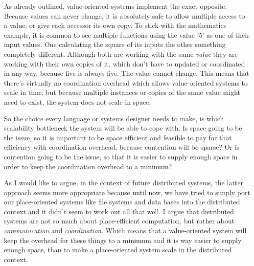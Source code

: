 As already outlined, value-oriented systems implement the exact
opposite. Because values can never change, it is absolutely
safe to allow multiple access to a value, or give each accessor
its own copy. To stick with the mathematics example, it is common
to see multiple functions using the value '5' as one of their
input values. One calculating the square of its inputs the other
something completely different. Although both are working with
the same \textit{value} they are working with their own copies of it,
which don't have to updated or coordinated in any way, because
five is always five. The value cannot change. This means that there's
virtually no coordination overhead which allows value-oriented
systems to scale in time, but because multiple instances or copies
of the same value might need to exist, the system does not scale in
space.
\newline

So the choice every language or systems designer needs to make,
is which scalability bottleneck the system will be able to cope with.
Is space going to be the issue, so it is important to be space efficient
and feasible to pay for that efficiency with coordination overhead,
because contention will be sparse? Or is contention going to be the
issue, so that it is easier to supply enough space in order to keep
the coordination overhead to a minimum?

As I would like to argue, in the context of future
distributed systems,
the latter approach seems more appropriate because until now, we
have tried to simply port our place-oriented systems like file
systems and data bases into the distributed context and it didn't
seem to work out all that well. I argue that distributed systems
are not so much about place-efficient computation, but rather about
\textit{communication} and \textit{coordination}. Which means that
a value-oriented system will keep the overhead for these things to
a minimum and it is way easier to supply enough space, than to make
a place-oriented system scale in the distributed context.



